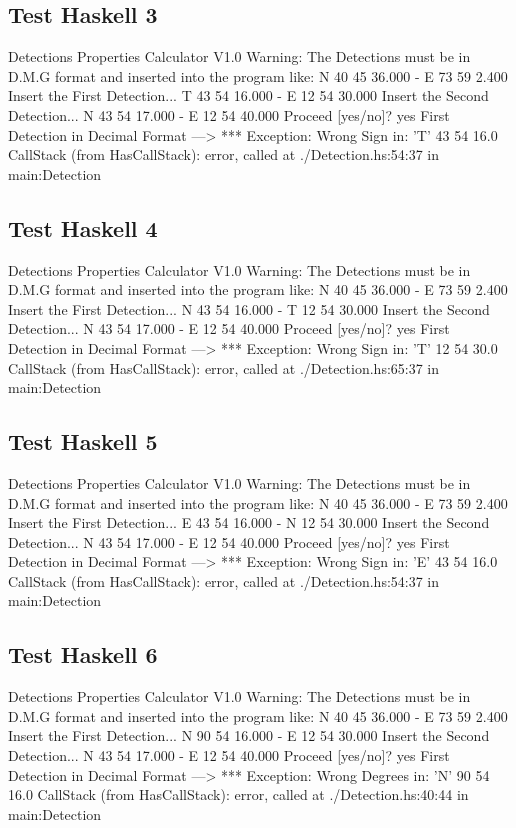 \documentclass{article}
\begin{document}
\subsection*{Test Haskell 3}
	\begin{spverbatim}
		Detections Properties Calculator V1.0 
		Warning: The Detections must be in D.M.G format and inserted into the program like: N 40 45 36.000 - E 73 59 2.400
		Insert the First Detection...
		T 43 54 16.000 - E 12 54 30.000
		Insert the Second Detection...
		N 43 54 17.000 - E 12 54 40.000
		Proceed [yes/no]?
		yes
		First Detection in Decimal Format ---> *** Exception: Wrong Sign in:  'T' 43 54 16.0
		CallStack (from HasCallStack):
		error, called at ./Detection.hs:54:37 in main:Detection	
	\end{spverbatim}

\subsection*{Test Haskell 4}
	\begin{spverbatim}
		Detections Properties Calculator V1.0 
		Warning: The Detections must be in D.M.G format and inserted into the program like: N 40 45 36.000 - E 73 59 2.400
		Insert the First Detection...
		N 43 54 16.000 - T 12 54 30.000
		Insert the Second Detection...
		N 43 54 17.000 - E 12 54 40.000
		Proceed [yes/no]?
		yes
		First Detection in Decimal Format ---> *** Exception: Wrong Sign in:  'T' 12 54 30.0
		CallStack (from HasCallStack):
		error, called at ./Detection.hs:65:37 in main:Detection
	\end{spverbatim}

\subsection*{Test Haskell 5}
	\begin{spverbatim}
		Detections Properties Calculator V1.0 
		Warning: The Detections must be in D.M.G format and inserted into the program like: N 40 45 36.000 - E 73 59 2.400
		Insert the First Detection...
		E 43 54 16.000 - N 12 54 30.000
		Insert the Second Detection...
		N 43 54 17.000 - E 12 54 40.000
		Proceed [yes/no]?
		yes
		First Detection in Decimal Format ---> *** Exception: Wrong Sign in:  'E' 43 54 16.0
		CallStack (from HasCallStack):
		error, called at ./Detection.hs:54:37 in main:Detection
	\end{spverbatim}

\subsection*{Test Haskell 6}
	\begin{spverbatim}
		Detections Properties Calculator V1.0 
		Warning: The Detections must be in D.M.G format and inserted into the program like: N 40 45 36.000 - E 73 59 2.400
		Insert the First Detection...
		N 90 54 16.000 - E 12 54 30.000
		Insert the Second Detection...
		N 43 54 17.000 - E 12 54 40.000
		Proceed [yes/no]?
		yes
		First Detection in Decimal Format ---> *** Exception: Wrong Degrees in:  'N' 90 54 16.0
		CallStack (from HasCallStack):
		error, called at ./Detection.hs:40:44 in main:Detection
	\end{spverbatim}
\end{document}
